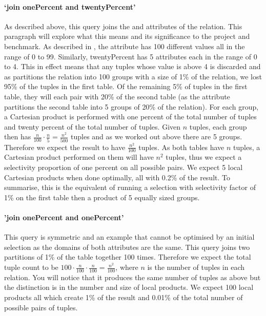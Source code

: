 \paragraph{`join onePercent and twentyPercent'} As described above, this query
joins the  and 
attributes of the  relation. This paragraph will explore
what this means and its significance to the project and benchmark. As described
in , the attribute 
has 100 different values all in the range of 0 to 99. Similarly, twentyPercent
has 5 attributes each in the range of 0 to 4. This in effect means that any
tuples whose  value is above 4 is discarded and as
 partitions the relation into 100 groups with a
size of 1\% of the relation, we lost 95\% of the tuples in the first table. Of
the remaining 5\% of tuples in the first table, they will each pair with 20\% of
the second table (as the attribute  partitions
the second table into 5 groups of 20\% of the relation). For each group, a
Cartesian product is performed with one percent of the total number of tuples
and twenty percent of the total number of tuples. Given $n$ tuples, each group
then has $\frac{n}{100} \cdot \frac{n}{5} = \frac{n^2}{500}$ tuples and as we
worked out above there are 5 groups. Therefore we expect the result to have
$\frac{n^2}{100}$ tuples. As both tables have $n$ tuples, a Cartesian product
performed on them will have $n^2$ tuples, thus we expect a selectivity
proportion of one percent on all possible pairs. We expect 5 local Cartesian
products when done optimally, all with 0.2\% of the result. To summarise, this
is the equivalent of running a selection with selectivity factor of 1\% on the
first table then a product of 5 equally sized groups.

\paragraph{'join onePercent and onePercent'} This query is symmetric and an
example that cannot be optimised by an initial selection as the domains of both
attributes are the same. This query joins two partitions of 1\% of the table
together 100 times. Therefore we expect the total tuple count to be $100 \cdot
\frac{n}{100} \cdot \frac{n}{100} = \frac{n^2}{100}$, where $n$ is the number of
tuples in each relation. You will notice that it produces the same number of
tuples as above but the distinction is in the number and size of local products.
We expect 100 local products all which create 1\% of the result and 0.01\% of
the total number of possible pairs of tuples.

